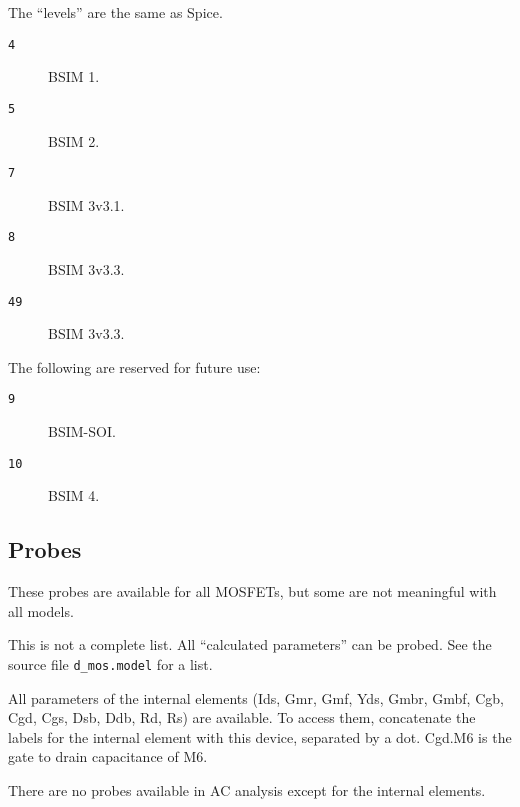 The ``levels'' are the same as Spice.

\begin{description}
\item[{\tt 4}] BSIM 1.
\item[{\tt 5}] BSIM 2.
\item[{\tt 7}] BSIM 3v3.1.
\item[{\tt 8}] BSIM 3v3.3.
\item[{\tt 49}] BSIM 3v3.3.
\end{description}

The following are reserved for future use:
\begin{description}
\item[{\tt 9}] BSIM-SOI.
\item[{\tt 10}] BSIM 4.
\end{description}
\subsection{Probes}

These probes are available for all MOSFETs, but some are not
meaningful with all models.

This is not a complete list.  All ``calculated parameters'' can be
probed.  See the source file {\tt d\_mos.model} for a list.

All parameters of the internal elements (Ids, Gmr, Gmf, Yds, Gmbr,
Gmbf, Cgb, Cgd, Cgs, Dsb, Ddb, Rd, Rs) are available.  To access them,
concatenate the labels for the internal element with this device,
separated by a dot.  Cgd.M6 is the gate to drain capacitance of M6.

There are no probes available in AC analysis except for the internal
elements.
 
